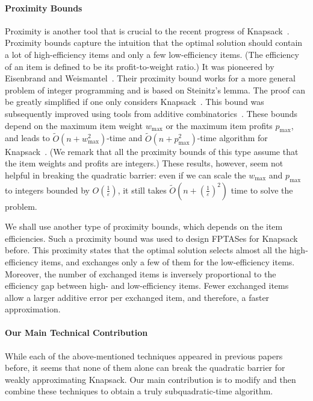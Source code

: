 \documentclass[a4paper,UKenglish,cleveref, autoref, thm-restate, pdfa]{lipics-v2021}
\newcommand{\eps}{\varepsilon}
\begin{document}
\paragraph*{Proximity Bounds}
Proximity is another tool that is crucial to the recent progress of Knapsack~\cite{PRW21,CLMZ24aSODA,Jin24,Bri24,CLMZ24bSTOCKnapsack}. Proximity bounds capture the intuition that the optimal solution should contain a lot of high-efficiency items and only a few low-efficiency items. (The efficiency of an item is defined to be its profit-to-weight ratio.) It was pioneered by Eisenbrand and Weismantel~\cite{EW19}. Their proximity bound works for a more general problem of integer programming and is based on Steinitz's lemma. The proof can be greatly simplified if one only considers Knapsack~\cite{PRW21}.  This bound was subsequently improved using tools from additive combinatorics~\cite{CLMZ24aSODA,Bri24,Jin24}. These bounds depend on the maximum item weight $w_{\max}$ or the maximum item profits $p_{\max}$, and leads to $\tilde{O}(n + w^2_{\max})$-time and $\tilde{O}(n + p^2_{\max})$-time algorithm for Knapsack~\cite{Jin24,Bri24}. (We remark that all the proximity bounds of this type assume that the item weights and profits are integers.) These results, however, seem not helpful in breaking the quadratic barrier: even if we can scale the $w_{\max}$ and $p_{\max}$ to integers bounded by $O(\frac{1}{\eps})$, it still takes  $\tilde{O}(n + (\frac{1}{\eps})^2)$ time to solve the problem.

We shall use another type of proximity bounds, which depends on the item efficiencies. Such a proximity bound was used to design FPTASes for Knapsack~\cite{Jin19,DJM23} before. This proximity states that the optimal solution selects almost all the high-efficiency items, and exchanges only a few of them for the low-efficiency items. Moreover, the number of exchanged items is inversely proportional to the efficiency gap between high- and low-efficiency items. Fewer exchanged items allow a larger additive error per exchanged item, and therefore, a faster approximation.


\paragraph*{Our Main Technical Contribution}
While each of the above-mentioned techniques appeared in previous papers before, it seems that none of them alone can break the quadratic barrier for weakly approximating Knapsack. Our main contribution is to modify and then combine these techniques to obtain a truly subquadratic-time algorithm. 
\end{document}
